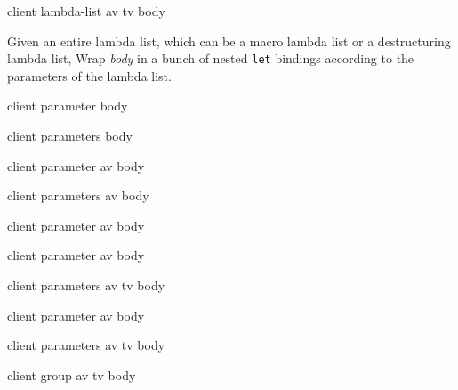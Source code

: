  {client lambda-list av tv body}

Given an entire lambda list, which can be a macro lambda list or a
destructuring lambda list, Wrap \textit{body} in a bunch of nested
\texttt{let} bindings according to the parameters of the lambda list.

 {client parameter body}

 {client parameters body}

 {client parameter av body}

 {client parameters av body}

 {client parameter av body}

 {client parameter av body}

 {client parameters av tv body}

 {client parameter av body}

 {client parameters av tv body}

 {client group av tv body}

